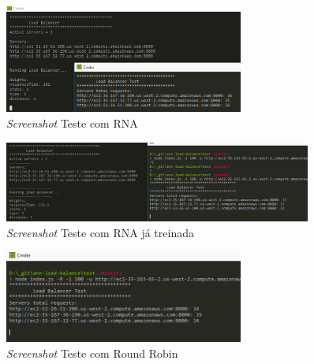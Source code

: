 \begin{figure}[htb]
	\caption{\label{fig:resultann} \textit{Screenshot} Teste com RNA}
	\begin{center}
		\includegraphics[width=0.70\textwidth]{img/resquisicao-ann.png}
	\end{center}
\end{figure}
\begin{figure}[htb]
	\caption{\label{fig:resultann2} \textit{Screenshot} Teste com RNA já treinada}
	\begin{center}
		\includegraphics[width=0.90\textwidth]{img/resquisicao-ann-second.png}
	\end{center}
\end{figure}

\vfill
\begin{figure}[htb]
	\caption{\label{fig:resultrr} \textit{Screenshot} Teste com Round Robin}
	\begin{center}
		\includegraphics[width=0.70\textwidth]{img/resquisicao-round.png}
	\end{center}
\end{figure}
